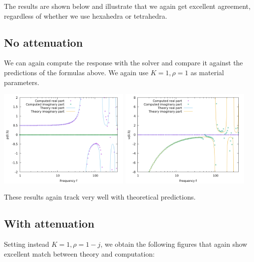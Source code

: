 \documentclass{article}
\begin{document}
The results are shown below and illustrate that we again get excellent
agreement, regardless of whether we use hexahedra or tetrahedra.

\subsection{No attenuation}

We can again compute the response with the solver and compare it
against the predictions of the formulas above. We again use
$K=1,\rho=1$ as material parameters.

\begin{center}
\includegraphics[width=0.48\textwidth]{wave-guide-tet/no-attenuation/pressure-at-center.png}
\includegraphics[width=0.48\textwidth]{wave-guide-tet/no-attenuation/velocity-at-center.png}
\end{center}

These results again track very well with theoretical predictions.

\subsection{With attenuation}

Setting instead $K=1,\rho=1-j$, we obtain the following figures that
again show excellent match between theory and computation:
\end{document}
